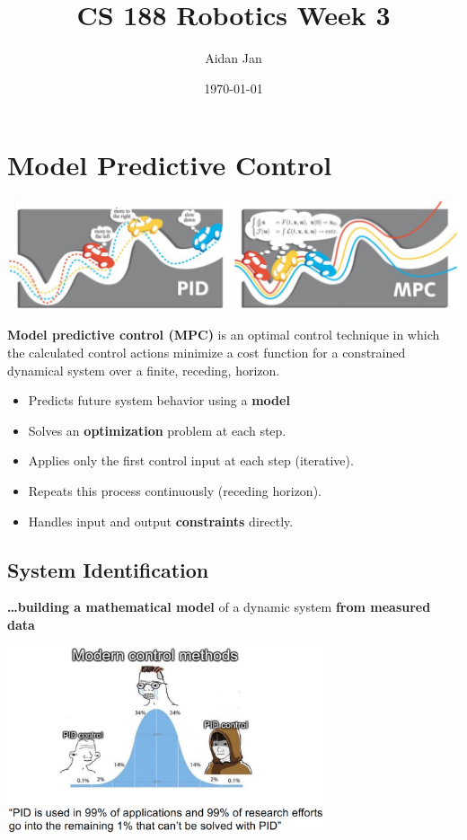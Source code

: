 \documentclass[10pt]{article}
\title{CS 188 Robotics Week 3}
\author{Aidan Jan}
\date{\today}
\begin{document}
\maketitle 

\section*{Model Predictive Control}
\begin{center} 
	\includegraphics*[width=\textwidth]{L1_1.png} 
\end{center}
\textbf{Model predictive control (MPC)} is an optimal control technique in which the calculated control actions minimize a cost function for a constrained dynamical system over a finite, receding, horizon.
\begin{itemize}
	\item Predicts future system behavior using a \textbf{model}
	\item Solves an \textbf{optimization} problem at each step.
	\item Applies only the first control input at each step (iterative).
	\item Repeats this process continuously (receding horizon).
	\item Handles input and output \textbf{constraints} directly.
\end{itemize}

\subsection*{System Identification}
\textbf{\dots building a mathematical model} of a dynamic system \textbf{from measured data}

\begin{center} 
	\includegraphics*[width=0.7\textwidth]{L1_2.png} 
\end{center}
\end{document}
